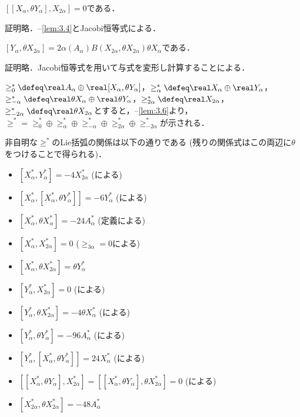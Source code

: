 \begin{lem}\label{lem:3.5}
  $[[X_{\alpha}, \theta Y_{\alpha}], X_{2\alpha}] = 0$である．

  証明略．--\ref{lem:3.4}とJacobi恒等式による．
\end{lem}

\begin{lem}\label{lem:3.6}
  $[Y_{\alpha},\theta X_{2\alpha}] = 2\alpha(A_{\alpha})B(X_{2\alpha}, \theta X_{2\alpha})\theta X_{\alpha} $である．

  証明略．Jacobi恒等式を用いて与式を変形し計算することによる．
\end{lem}




\begin{npfwn}
  $\ge^{*}_0 \defeq \real A_{\alpha}\oplus \real[X_{\alpha}, \theta Y_{\alpha}] $，$\ge^{*}_{\alpha} \defeq \real X_{\alpha}\oplus \real Y_{\alpha}  $，$\ge^{*}_{-\alpha} \defeq \real \theta X_{\alpha}\oplus \real \theta Y_{\alpha}  $，$\ge^{*}_{2\alpha} \defeq \real X_{2\alpha} $，$\ge^{*}_{-2\alpha} \defeq \real \theta X_{2\alpha}$とすると，--\ref{lem:3.6}より，$\ge^{*} = \ge^{*}_{0} \oplus \ge^{*}_{\alpha}\oplus \ge^{*}_{-\alpha} \oplus \ge^{*}_{2\alpha} \oplus \ge^{*}_{-2\alpha} $が示される．

  
  非自明な$\ge^{*} $のLie括弧の関係は以下の通りである (残りの関係式はこの両辺に$\theta$をつけることで得られる)．

  \begin{itemize}
  \item $[X_{\alpha}^{*}, Y_{\alpha}^{*}] = -4X_{2\alpha}^{*} $ (による)
  \item $[X_{\alpha}^{*},[X_{\alpha}^{*}, \theta Y_{\alpha}^{*}]]  = -6Y_{\alpha}^{*}$ (による)
  \item $[X_{\alpha}^{*}, \theta X_{\alpha}^{*}] = -24A_{\alpha}^{*} $ (定義による)
  \item $[X_{\alpha}^{*},X_{2\alpha}^{*}] = 0$ ($\ge_{3\alpha} = 0$による)
  \item$[X_{\alpha}^{*}, \theta X_{2\alpha}^{*}] = \theta Y_{\alpha}^{*} $
  \item $[Y_{\alpha}^{*},X_{2\alpha}^{*}] = 0$ (による)
  \item $[Y_{\alpha}^{*},\theta X_{2\alpha}^{*}] = -4\theta X_{\alpha}^{*} $ (による)
  \item $[Y_{\alpha}^{*}, \theta Y_{\alpha}^{*}] = -96A_{\alpha}^{*} $ (による)
    \item $[Y_{\alpha}^{*}, [X_{\alpha}^{*}, \theta Y_{\alpha}^{*}]] = 24X_{\alpha}^{*} $ (による)
    \item $[[X_{\alpha}^{*}, \theta Y_{\alpha}], X_{2\alpha}^{*}] = [[X_{\alpha}^{*}, \theta Y_{\alpha}], \theta X_{2\alpha}^{*}] = 0$ (による)
    \item $[X_{2\alpha}^{*} ,\theta X_{2\alpha}^{*} ] = -48A_{\alpha}^{*} $
  \end{itemize}
  

\end{npfwn}
